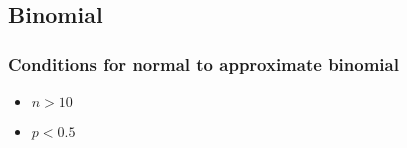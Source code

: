 \documentclass{article}[18pt]
\begin{document}
\subsection{Binomial}
\subsubsection{Conditions for normal to approximate binomial}
\begin{itemize}
\item $n>10$
\item $p<0.5$
\end{itemize}
\end{document}
